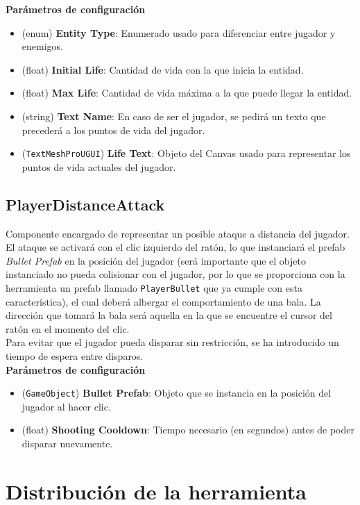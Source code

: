\textbf{Parámetros de configuración}
\begin{itemize}
	\item (enum) \textbf{Entity Type}: Enumerado usado para diferenciar entre jugador y enemigos.
	\item (float) \textbf{Initial Life}: Cantidad de vida con la que inicia la entidad.
	\item (float) \textbf{Max Life}: Cantidad de vida máxima a la que puede llegar la entidad.
	\item (string) \textbf{Text Name}: En caso de ser el jugador, se pedirá un texto que precederá a los puntos de vida del jugador.
	\item (\texttt{TextMeshProUGUI}) \textbf{Life Text}: Objeto del Canvas usado para representar los puntos de vida actuales del jugador.
\end{itemize}

\subsection{PlayerDistanceAttack}

Componente encargado de representar un posible ataque a distancia del jugador. El ataque se activará con el clic izquierdo del ratón, lo que instanciará el prefab \textit{Bullet Prefab} en la posición del jugador (será importante que el objeto instanciado no pueda colisionar con el jugador, por lo que se proporciona con la herramienta un prefab llamado \texttt{PlayerBullet} que ya cumple con esta característica), el cual deberá albergar el comportamiento de una bala. La dirección que tomará la bala será aquella en la que se encuentre el cursor del ratón en el momento del clic.\\

Para evitar que el jugador pueda disparar sin restricción, se ha introducido un tiempo de espera entre disparos.\\

\textbf{Parámetros de configuración}
\begin{itemize}
	\item (\texttt{GameObject}) \textbf{Bullet Prefab}: Objeto que se instancia en la posición del jugador al hacer clic.
	\item (float) \textbf{Shooting Cooldown}: Tiempo necesario (en segundos) antes de poder disparar nuevamente.
\end{itemize}

\section {Distribución de la herramienta}

